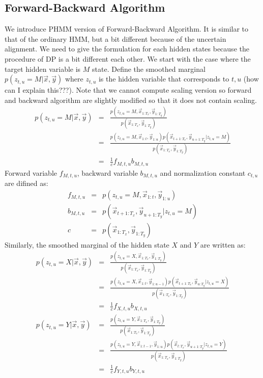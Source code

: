 \subsection{Forward-Backward Algorithm}
We introduce PHMM version of Forward-Backward Algorithm. 
It is similar to that of the ordinary HMM, but a bit different because of the uncertain alignment. 
We need to give the formulation for each hidden states because the procedure of DP is a bit different each other.
We start with the case where the target hidden variable is $M$ state. 
Define the smoothed marginal $p(z_{t, u} = M | \vec{x}, \vec{y})$ where $z_{t, u}$ is the hidden variable that corresponds to $t, u$ (how can I explain this???). Note that we cannot compute scaling version so forward and backward algorithm are slightly modified so that it does not contain scaling.
\begin{eqnarray}
  p(z_{t,u} = M | \vec{x}, \vec{y}) 
  &=&\frac{ p(z_{t, u}=M, \vec{x}_{1:T_x}, \vec{y}_{1:T_y}) } {p(\vec{x}_{1:T_x}, \vec{y}_{1:T_y})} \nonumber\\
  &=& \frac{ p(z_{t, u}=M , \vec{x}_{1:t}, \vec{y}_{1:u}) p(\vec{x}_{t+1:T_x}, \vec{y}_{u+1:T_y} | z_{t, u}= M) } {p(\vec{x}_{1:T_x}, \vec{y}_{1:T_y})} \nonumber \\
  &=& \frac{1}{c} f_{M, t, u} b_{M, t, u}
\end{eqnarray}
Forward variable $f_{M, t, u}$, backward variable $b_{M, t, u}$ and normalization constant $c_{t, u}$ are difined as:
\begin{eqnarray}
  f_{M, t, u} &=& p(z_{t, u}=M , \vec{x}_{1:t}, \vec{y}_{1:u}) \\
  b_{M, t, u} &=& p(\vec{x}_{t+1:T_x}, \vec{y}_{u+1:T_y} | z_{t, u}= M) \\
  c    &=& p(\vec{x}_{1:T_x}, \vec{y}_{1:T_y})
\end{eqnarray}
Similarly, the smoothed marginal of the hidden state $X$ and $Y$ are written as:
\begin{eqnarray}
p(z_{t,u} = X | \vec{x}, \vec{y}) &=& \frac{ p(z_{t, u}=X, \vec{x}_{1:T_x}, \vec{y}_{1:T_y}) } {p(\vec{x}_{1:T_x}, \vec{y}_{1:T_y})} \nonumber\\
                            &=& \frac{ p(z_{t, u}=X , \vec{x}_{1:t}, \vec{y}_{1:u-1}) p(\vec{x}_{t+1:T_x}, \vec{y}_{u:T_y} | z_{t, u}= X) } {p(\vec{x}_{1:T_x}, \vec{y}_{1:T_y})} \nonumber \\
                                  &=& \frac{1}{c} f_{X, t, u} b_{X, t, u} \\
  p(z_{t,u} = Y | \vec{x}, \vec{y}) &=& \frac{ p(z_{t, u}=Y, \vec{x}_{1:T_x}, \vec{y}_{1:T_y}) } {p(\vec{x}_{1:T_x}, \vec{y}_{1:T_y})} \nonumber\\
                            &=& \frac{ p(z_{t, u}=Y , \vec{x}_{1:t-1}, \vec{y}_{1:u}) p(\vec{x}_{t:T_x}, \vec{y}_{u+1:T_y} | z_{t, u}= Y) } {p(\vec{x}_{1:T_x}, \vec{y}_{1:T_y})} \nonumber \\
                                  &=& \frac{1}{c} f_{Y, t, u} b_{Y, t, u}
\end{eqnarray}
